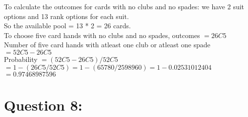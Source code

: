 \documentclass[14pt]{extreport}
\begin{document}
\begin{enumerate}[label=(\alph*)]
To calculate the outcomes for cards with no clubs and no spades: we have 2 suit options and 13 rank options for each suit. \\
So the available pool = 13 * 2 = 26 cards.\\
To choose five card hands with no clubs and no spades, outcomes  $= 26C5$ \\

Number of five card hands with atleast one club or atleast one spade $ = 52C5 - 26C5 $ \\

Probability $ = \left(52C5 - 26C5\right) / 52C5 $ \\
 $= 1 - \left(26C5 / 52C5\right) = 1 - \left(65780 / 2598960 \right) =  1- 0.02531012404$ \\
  $ = 0.97468987596 $ \\
  
  

\end{enumerate}
\newpage

\section*{Question 8:}
\end{document}
